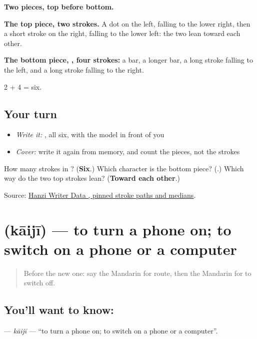 \begin{quote}
\end{quote}

\textbf{Two pieces, top before bottom.}

\textbf{The top piece, two strokes.} A dot on the left, falling to the lower right, then a short stroke on the right, falling to the lower left: the two lean toward each other.

\textbf{The bottom piece, , four strokes:} a bar, a longer bar, a long stroke falling to the left, and a long stroke falling to the right.

2 + 4 = six.

\subsection*{Your turn}
\begin{itemize}
\raggedright
  \item \emph{Write it:} , all six, with the model in front of you
  \item \emph{Cover:} write it again from memory, and count the pieces, not the strokes
\end{itemize}

\begin{tcolorbox}[breakable,colback=teal!4,colframe=teal!35!black,title={Before you move on}]
How many strokes in ? (\textbf{Six}.) Which character is the bottom piece? (\textbf{}.) Which way do the two top strokes lean? (\textbf{Toward each other}.)

Source: \href{https://raw.githubusercontent.com/chanind/hanzi-writer-data/68d10a4b21150cae5e1ebbd223eed289cf32d90c/data/\%E5\%85\%B3.json}{Hanzi Writer Data , pinned stroke paths and medians}.
\end{tcolorbox}
\section[\texorpdfstring{\zh{开机} (kāijī)}{开机 (kāijī)}]{ (kāijī) — to turn a phone on; to switch on a phone or a computer}

\label{lesson:ZH-C198-kaiji}



\begin{quote}
Before the new one: say the Mandarin for route, then the Mandarin for to switch off.
\end{quote}

\subsection*{You'll want to know: }
\textbf{} — \emph{kāijī} — \textquotedblleft{}to turn a phone on; to switch on a phone or a computer\textquotedblright{}.

